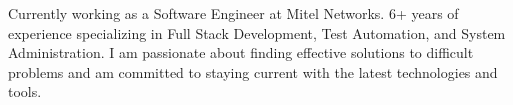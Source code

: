 

\begin{cvparagraph}

Currently working as a Software Engineer at Mitel Networks. 6+ years of experience specializing in Full Stack Development, Test Automation, and System Administration. I am passionate about finding effective solutions to difficult problems and am committed to staying current with the latest technologies and tools.
\end{cvparagraph}
